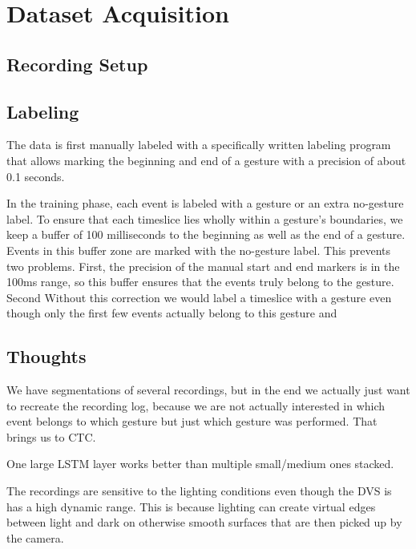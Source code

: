\chapter{Dataset Acquisition}
\label{chapter:acquisition}

\section{Recording Setup}
\label{sec:setup}

\section{Labeling}
\label{sec:labeling}

The data is first manually labeled with a specifically written labeling program that allows marking the beginning and end of a gesture with a precision of about 0.1 seconds.

In the training phase, each event is labeled with a gesture or an extra no-gesture label.
To ensure that each timeslice lies wholly within a gesture's boundaries, we keep a buffer of 100 milliseconds to the beginning as well as the end of a gesture.
Events in this buffer zone are marked with the no-gesture label.
This prevents two problems.
First, the precision of the manual start and end markers is in the 100ms range, so this buffer ensures that the events truly belong to the gesture.
Second
Without this correction we would label a timeslice with a gesture even though only the first few events actually belong to this gesture and

\section{Thoughts}
\label{sec:thoughts}

We have segmentations of several recordings, but in the end we actually just want to recreate the recording log, because we are not actually interested in which event belongs to which gesture but just which gesture was performed.
That brings us to CTC.

One large LSTM layer works better than multiple small/medium ones stacked.

The recordings are sensitive to the lighting conditions even though the DVS is has a high dynamic range.
This is because lighting can create virtual edges between light and dark on otherwise smooth surfaces that are then picked up by the camera.


